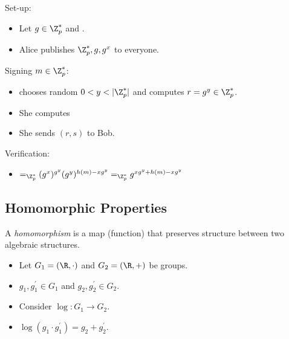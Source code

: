 \begin{frame}
  \begin{definition}
    Set-up:
    \begin{itemize}
      \item Let \(g\in \Z_p^*\) and .
      \item Alice publishes \(\Z_p^*, g, g^x\) to everyone.
    \end{itemize}
    Signing \(m\in \Z_p^*\):
    \begin{itemize}
      \item {} chooses random \(0 < y < |\Z_p^*|\) and computes 
        \(r = g^y\in \Z_p^*\).
      \item She computes 
      \item She sends \((r, s)\) to Bob.
    \end{itemize}
    Verification:
    \begin{itemize}
      \item {}\( =_{\Z_p^*}
          (g^x)^{g^y} (g^y)^{h(m) - xg^y} =_{\Z_p^*}
          g^{xg^y + h(m) - xg^y}\)
    \end{itemize}
  \end{definition}
\end{frame}

\subsection{Homomorphic Properties}

\begin{frame}
  \begin{definition}[Homomorphism]
    A \emph{homomorphism} is a map (function) that preserves structure between 
    two algebraic structures.
  \end{definition}

  \pause{}

  \begin{example}
    \begin{itemize}
      \item Let \(G_1 = (\R, \cdot)\) and \(G_2 = (\R, +)\) be groups.
      \item \(g_1, g_1^\prime\in G_1\) and \(g_2, g_2^\prime\in G_2\).

        \pause{}

      \item Consider \(\log\colon G_1\to G_2\).
        
        \pause{}

      \item \(\log(g_1\cdot g_1^\prime) = g_2 + g_2^\prime\).
    \end{itemize}
  \end{example}
\end{frame}

